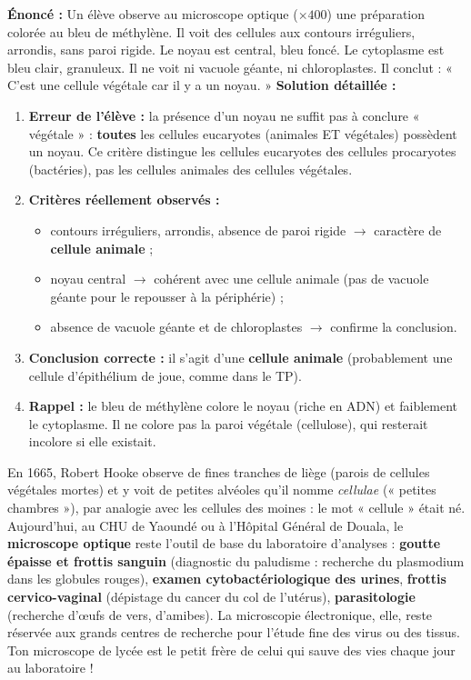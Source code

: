 \documentclass[11pt]{article}
\begin{document}
\begin{exoresolu}
\textbf{Énoncé :} Un élève observe au microscope optique ($\times 400$) une préparation colorée au bleu de méthylène. Il voit des cellules aux contours irréguliers, arrondis, sans paroi rigide. Le noyau est central, bleu foncé. Le cytoplasme est bleu clair, granuleux. Il ne voit ni vacuole géante, ni chloroplastes. Il conclut : « C'est une cellule végétale car il y a un noyau. »
\tcblower
\textbf{Solution détaillée :}
\begin{enumerate}
    \item \textbf{Erreur de l'élève :} la présence d'un noyau ne suffit pas à conclure « végétale » : \textbf{toutes} les cellules eucaryotes (animales ET végétales) possèdent un noyau. Ce critère distingue les cellules eucaryotes des cellules procaryotes (bactéries), pas les cellules animales des cellules végétales.
    \item \textbf{Critères réellement observés :}
    \begin{itemize}
        \item contours irréguliers, arrondis, absence de paroi rigide $\rightarrow$ caractère de \textbf{cellule animale} ;
        \item noyau central $\rightarrow$ cohérent avec une cellule animale (pas de vacuole géante pour le repousser à la périphérie) ;
        \item absence de vacuole géante et de chloroplastes $\rightarrow$ confirme la conclusion.
    \end{itemize}
    \item \textbf{Conclusion correcte :} il s'agit d'une \textbf{cellule animale} (probablement une cellule d'épithélium de joue, comme dans le TP).
    \item \textbf{Rappel :} le bleu de méthylène colore le noyau (riche en ADN) et faiblement le cytoplasme. Il ne colore pas la paroi végétale (cellulose), qui resterait incolore si elle existait.
\end{enumerate}
\end{exoresolu}

\begin{savaistu}
En 1665, Robert Hooke observe de fines tranches de liège (parois de cellules végétales mortes) et y voit de petites alvéoles qu'il nomme \emph{cellulae} (« petites chambres »), par analogie avec les cellules des moines : le mot « cellule » était né. Aujourd'hui, au CHU de Yaoundé ou à l'Hôpital Général de Douala, le \textbf{microscope optique} reste l'outil de base du laboratoire d'analyses : \textbf{goutte épaisse et frottis sanguin} (diagnostic du paludisme : recherche du plasmodium dans les globules rouges), \textbf{examen cytobactériologique des urines}, \textbf{frottis cervico-vaginal} (dépistage du cancer du col de l'utérus), \textbf{parasitologie} (recherche d'œufs de vers, d'amibes). La microscopie électronique, elle, reste réservée aux grands centres de recherche pour l'étude fine des virus ou des tissus. Ton microscope de lycée est le petit frère de celui qui sauve des vies chaque jour au laboratoire !
\end{savaistu}
\end{document}
